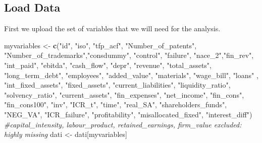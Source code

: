 \documentclass[]{article}
\newenvironment{Shaded}{\begin{snugshade}}{\end{snugshade}}
\newcommand{\CommentTok}[1]{\textcolor[rgb]{0.56,0.35,0.01}{\textit{#1}}}
\newcommand{\KeywordTok}[1]{\textcolor[rgb]{0.13,0.29,0.53}{\textbf{#1}}}
\newcommand{\NormalTok}[1]{#1}
\newcommand{\StringTok}[1]{\textcolor[rgb]{0.31,0.60,0.02}{#1}}
\begin{document}
\hypertarget{load-data}{%
\subsection{Load Data}\label{load-data}}

First we upload the set of variables that we will need for the analysis.

\begin{Shaded}
\begin{Highlighting}[]
\NormalTok{myvariables <-}\StringTok{ }\KeywordTok{c}\NormalTok{(}\StringTok{"id"}\NormalTok{, }\StringTok{"iso"}\NormalTok{, }\StringTok{"tfp_acf"}\NormalTok{,  }\StringTok{"Number_of_patents"}\NormalTok{,}
                 \StringTok{"Number_of_trademarks"}\NormalTok{,}\StringTok{"consdummy"}\NormalTok{, }\StringTok{"control"}\NormalTok{,}
                 \StringTok{"failure"}\NormalTok{, }\StringTok{"nace_2"}\NormalTok{,}\StringTok{"fin_rev"}\NormalTok{, }\StringTok{"int_paid"}\NormalTok{,}
                 \StringTok{"ebitda"}\NormalTok{, }\StringTok{"cash_flow"}\NormalTok{, }\StringTok{"depr"}\NormalTok{, }\StringTok{"revenue"}\NormalTok{,}
                 \StringTok{"total_assets"}\NormalTok{, }\StringTok{"long_term_debt"}\NormalTok{, }\StringTok{"employees"}\NormalTok{,}
                 \StringTok{"added_value"}\NormalTok{, }\StringTok{"materials"}\NormalTok{, }\StringTok{"wage_bill"}\NormalTok{, }\StringTok{"loans"}\NormalTok{ ,}
                 \StringTok{"int_fixed_assets"}\NormalTok{, }\StringTok{"fixed_assets"}\NormalTok{, }\StringTok{"current_liabilities"}\NormalTok{,}
                 \StringTok{"liquidity_ratio"}\NormalTok{, }\StringTok{"solvency_ratio"}\NormalTok{, }\StringTok{"current_assets"}\NormalTok{,}
                 \StringTok{"fin_expenses"}\NormalTok{, }\StringTok{"net_income"}\NormalTok{, }\StringTok{"fin_cons"}\NormalTok{, }\StringTok{"fin_cons100"}\NormalTok{,}
                 \StringTok{"inv"}\NormalTok{,  }\StringTok{"ICR_t"}\NormalTok{, }\StringTok{"time"}\NormalTok{, }\StringTok{"real_SA"}\NormalTok{, }\StringTok{"shareholders_funds"}\NormalTok{,}
                 \StringTok{"NEG_VA"}\NormalTok{, }\StringTok{"ICR_failure"}\NormalTok{, }\StringTok{"profitability"}\NormalTok{,}
                 \StringTok{"misallocated_fixed"}\NormalTok{, }\StringTok{"interest_diff"}\NormalTok{) }
\CommentTok{#capital_intensity, labour_product, retained_earnings, firm_value excluded: highly missing}
\NormalTok{dati <-}\StringTok{ }\NormalTok{dati[myvariables]}
\end{Highlighting}
\end{Shaded}
\end{document}

